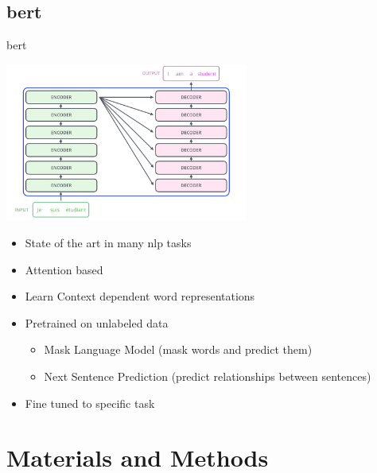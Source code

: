 \subsection{\acs{bert}}
\begin{frame}{\acf{bert}}
  \begin{center}
    \includegraphics[width=0.6\textwidth]{img/transformer1.png}
  \end{center}
  \begin{itemize}
  \item State of the art in many \acs{nlp} tasks
  \item \alert{Attention} based
  \item Learn \alert{Context dependent} word representations
  \item \alert{Pretrained} on unlabeled data
    \begin{itemize}
    \item Mask Language Model (mask words and predict them)
    \item Next Sentence Prediction (predict relationships between sentences) 
    \end{itemize}
  \item \alert{Fine tuned} to specific task
  \end{itemize}
\end{frame}

\section{Materials and Methods}

